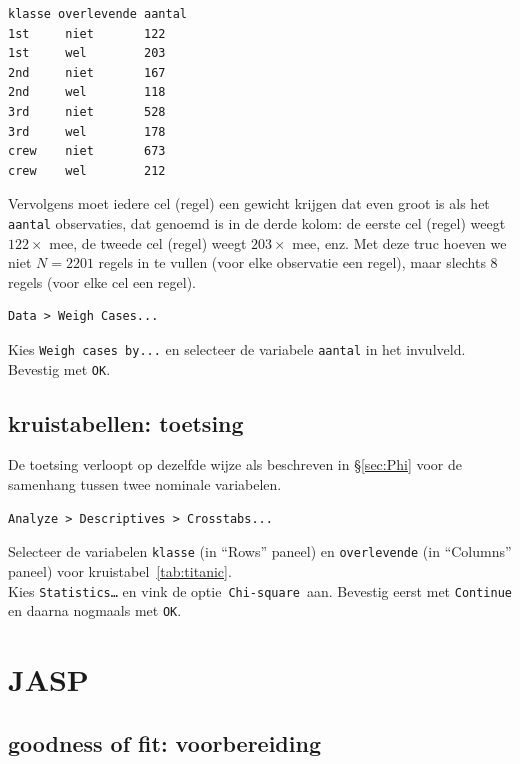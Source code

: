 \documentclass[
]{book}
\begin{document}
\begin{verbatim}
klasse overlevende aantal
1st     niet       122
1st     wel        203
2nd     niet       167
2nd     wel        118
3rd     niet       528
3rd     wel        178
crew    niet       673
crew    wel        212
\end{verbatim}

Vervolgens moet iedere cel (regel) een gewicht krijgen dat even groot is
als het \texttt{aantal} observaties, dat genoemd is in de derde kolom: de
eerste cel (regel) weegt \(122\times\) mee, de tweede cel (regel) weegt
\(203\times\) mee, enz. Met deze truc hoeven we niet \(N=2201\) regels in te
vullen (voor elke observatie een regel), maar slechts 8 regels (voor
elke cel een regel).

\begin{verbatim}
Data > Weigh Cases... 
\end{verbatim}

Kies \texttt{Weigh\ cases\ by...} en selecteer de variabele \texttt{aantal} in
het invulveld. Bevestig met \texttt{OK}.

\hypertarget{kruistabellen-toetsing}{%
\subsection{kruistabellen: toetsing}\label{kruistabellen-toetsing}}

De toetsing verloopt op dezelfde wijze als beschreven in
§\ref{sec:Phi} voor
de samenhang tussen twee nominale variabelen.

\begin{verbatim}
Analyze > Descriptives > Crosstabs...
\end{verbatim}

Selecteer de variabelen \texttt{klasse} (in ``Rows'' paneel) en \texttt{overlevende} (in
``Columns'' paneel) voor
kruistabel~\ref{tab:titanic}.\\
Kies \texttt{Statistics\ldots{}} en vink de optie~\texttt{Chi-square}~aan. Bevestig eerst met
\texttt{Continue} en daarna nogmaals met \texttt{OK}.

\hypertarget{jasp-16}{%
\section{JASP}\label{jasp-16}}

\hypertarget{goodness-of-fit-voorbereiding-1}{%
\subsection{goodness of fit: voorbereiding}\label{goodness-of-fit-voorbereiding-1}}
\end{document}
